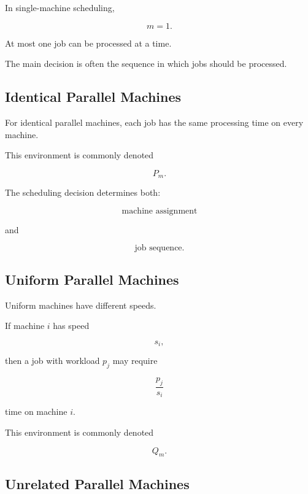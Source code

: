 In single-machine scheduling,

\[
\boxed{
m=1.
}
\]

At most one job can be processed at a time.

The main decision is often the sequence in which jobs should be processed.

\subsection{Identical Parallel Machines}
\label{subsec:identical-parallel-machines}

For identical parallel machines, each job has the same processing time on
every machine.

This environment is commonly denoted

\[
\boxed{
P_m.
}
\]

The scheduling decision determines both:

\[
\boxed{
\text{machine assignment}
}
\]

and

\[
\boxed{
\text{job sequence}.
}
\]

\subsection{Uniform Parallel Machines}
\label{subsec:uniform-parallel-machines}

Uniform machines have different speeds.

If machine \(i\) has speed

\[
s_i,
\]

then a job with workload \(p_j\) may require

\[
\boxed{
\frac{p_j}{s_i}
}
\]

time on machine \(i\).

This environment is commonly denoted

\[
\boxed{
Q_m.
}
\]

\subsection{Unrelated Parallel Machines}
\label{subsec:unrelated-parallel-machines}


